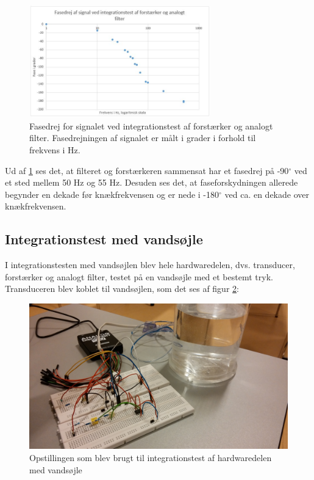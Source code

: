 \begin{figure}[H]
	\centering
	\includegraphics[width=0.7\textwidth]{Figurer/Hardware/FaseForstaerkerFilter}
	\caption{Fasedrej for signalet ved integrationstest af forstærker og analogt filter. Fasedrejningen af signalet er målt i grader i forhold til frekvens i Hz.}
	\label{fig:FaseForstaerkerFilter}
\end{figure}

Ud af \ref{fig:FaseForstaerkerFilter} ses det, at filteret og forstærkeren sammensat har et fasedrej på -90$^{\circ}$ ved et sted mellem 50 Hz og 55 Hz. Desuden ses det, at faseforskydningen allerede begynder en dekade før knækfrekvensen og er nede i -180$^{\circ}$ ved ca. en dekade over knækfrekvensen.

\subsection{Integrationstest med vandsøjle}
I integrationstesten med vandsøjlen blev hele hardwaredelen, dvs. transducer, forstærker og analogt filter, testet på en vandsøjle med et bestemt tryk. Transduceren blev koblet til vandsøjlen, som det ses af figur \ref{fig:IntegrationVandsoejle}: 

\begin{figure}[H]
	\centering
	\includegraphics[width=1\textwidth]{Figurer/Hardware/IntegrationVandsoejle}
	\caption{Opstillingen som blev brugt til integrationstest af hardwaredelen med vandsøjle}
	\label{fig:IntegrationVandsoejle}
\end{figure}

